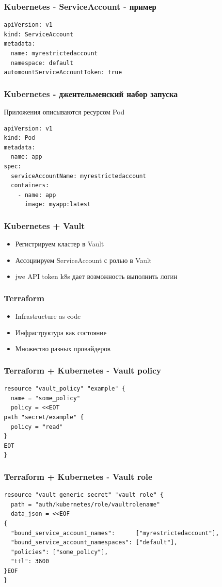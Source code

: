 \documentclass[mathserif,serif]{beamer}
\begin{document}
\begin{frame}[fragile]
	\frametitle{Kubernetes - ServiceAccount - пример}
	\begin{verbatim}
apiVersion: v1
kind: ServiceAccount
metadata:
  name: myrestrictedaccount
  namespace: default
automountServiceAccountToken: true
	\end{verbatim}
\end{frame}

\begin{frame}[fragile]
	\frametitle{Kubernetes - джентельменский набор запуска}
	Приложения описываются ресурсом Pod
	\begin{verbatim}
apiVersion: v1
kind: Pod
metadata:
  name: app
spec:
  serviceAccountName: myrestrictedaccount
  containers:
    - name: app
      image: myapp:latest
	\end{verbatim}
\end{frame}

\begin{frame}
	\frametitle{Kubernetes + Vault}
	\begin{itemize}
		\item{Регистрируем кластер в Vault}
		\item{Ассоциируем ServiceAccount с ролью в Vault}
		\item{jwe API token k8s дает возможность выполнить логин}
	\end{itemize}
\end{frame}

\begin{frame}
	\frametitle{Terraform}
	\begin{itemize}
		\item{Infrastructure as code}
		\item{Инфраструктура как состояние}
		\item{Множество разных провайдеров}
	\end{itemize}
\end{frame}

\begin{frame}[fragile]
	\frametitle{Terraform + Kubernetes - Vault policy}
	\begin{verbatim}
resource "vault_policy" "example" {
  name = "some_policy"
  policy = <<EOT
path "secret/example" {
  policy = "read"
}
EOT
}
	\end{verbatim}
\end{frame}


\begin{frame}[fragile]
	\frametitle{Terraform + Kubernetes - Vault role}
	\begin{verbatim}
resource "vault_generic_secret" "vault_role" {
  path = "auth/kubernetes/role/vaultrolename"
  data_json = <<EOF
{
  "bound_service_account_names":      ["myrestrictedaccount"],
  "bound_service_account_namespaces": ["default"],
  "policies": ["some_policy"],
  "ttl": 3600
}EOF
}
	\end{verbatim}
\end{frame}
\end{document}
